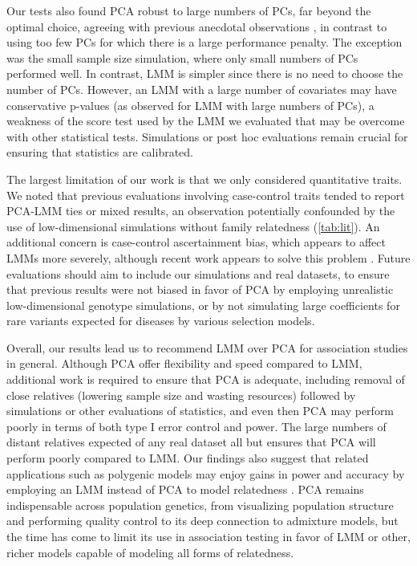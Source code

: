 \documentclass[11pt]{article}
\begin{document}
Our tests also found PCA robust to large numbers of PCs, far beyond the optimal choice, agreeing with previous anecdotal observations \citep{price_principal_2006, kang_variance_2010}, in contrast to using too few PCs for which there is a large performance penalty.
The exception was the small sample size simulation, where only small numbers of PCs performed well.
In contrast, LMM is simpler since there is no need to choose the number of PCs.
However, an LMM with a large number of covariates may have conservative p-values (as observed for LMM with large numbers of PCs), a weakness of the score test used by the LMM we evaluated that may be overcome with other statistical tests.
Simulations or post hoc evaluations remain crucial for ensuring that statistics are calibrated.

The largest limitation of our work is that we only considered quantitative traits.
We noted that previous evaluations involving case-control traits tended to report PCA-LMM ties or mixed results, an observation potentially confounded by the use of low-dimensional simulations without family relatedness (\cref{tab:lit}).
An additional concern is case-control ascertainment bias, which appears to affect LMMs more severely, although recent work appears to solve this problem \citep{yang_advantages_2014, zhou_efficiently_2018}.
Future evaluations should aim to include our simulations and real datasets, to ensure that previous results were not biased in favor of PCA by employing unrealistic low-dimensional genotype simulations, or by not simulating large coefficients for rare variants expected for diseases by various selection models.

Overall, our results lead us to recommend LMM over PCA for association studies in general.
Although PCA offer flexibility and speed compared to LMM, additional work is required to ensure that PCA is adequate, including removal of close relatives (lowering sample size and wasting resources) followed by simulations or other evaluations of statistics, and even then PCA may perform poorly in terms of both type I error control and power.
The large numbers of distant relatives expected of any real dataset all but ensures that PCA will perform poorly compared to LMM.
Our findings also suggest that related applications such as polygenic models may enjoy gains in power and accuracy by employing an LMM instead of PCA to model relatedness \citep{rakitsch_lasso_2013,qian_fast_2020}.
PCA remains indispensable across population genetics, from visualizing population structure and performing quality control to its deep connection to admixture models, but the time has come to limit its use in association testing in favor of LMM or other, richer models capable of modeling all forms of relatedness.
\end{document}
